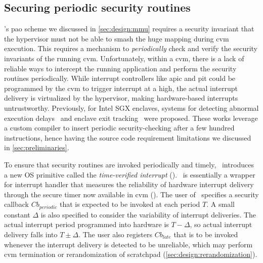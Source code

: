 \subsection{Securing periodic security routines}
\thename's \gls{pao} scheme we discussed in \cref{sec:design:mmu} requires a security invariant that the hypervisor must not be able to smash the huge mapping during \gls{cvm} execution.
This requires a mechanism to \emph{periodically} check and verify the security invariants of the running \gls{cvm}.
Unfortunately, within a \gls{cvm}, there is a lack of reliable ways to intercept the running application and perform the security routines periodically.
While interrupt controllers like \gls{apic} and \gls{pit} could be programmed by the \gls{cvm} to trigger interrupt at a high, the actual interrupt delivery is virtualized by the hypervisor, making hardware-based interrupts untrustworthy.
Previously, for Intel SGX enclaves, systems for detecting abnormal execution delays~\cite{dejavu} and enclave exit tracking~\cite{oleksenko2018varys} were proposed.
These works leverage a custom compiler to insert periodic security-checking after a few hundred instructions, hence having the source code requirement limitations we discussed in \cref{sec:preliminaries}.

To ensure that security routines are invoked periodically and timely, \thename\ introduces a new OS primitive called the \emph{time-verified interrupt} (\veriint).
\veriint\ is essentially a wrapper for interrupt handler that measures the reliability of hardware interrupt delivery through the secure timer now available in \gls{cvm} (\othree).
The user of \veriint\ specifies a security callback $Cb_{periodic}$ that is expected to be invoked at each period $T$.
A small constant $\Delta$ is also specified to consider the variability of interrupt deliveries.
The actual interrupt period programmed into hardware is $T - \Delta$, so actual interrupt delivery falls into $T \pm \Delta$.
The user also registers $Cb_{late}$ that is to be invoked whenever the interrupt delivery is detected to be unreliable, which may perform \gls{cvm} termination or rerandomization of scratchpad (\cref{sec:design:rerandomization}).

